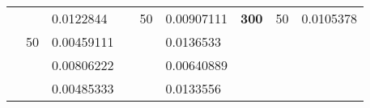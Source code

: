 \begin{table}[H]
\begin{tabular}{|cclcclccc}
\rowcolor[HTML]{DDFDFF} 
\multicolumn{1}{|c|}{\cellcolor[HTML]{FFFFC7}}                                & \multicolumn{1}{c|}{\cellcolor[HTML]{DDFDFF}}                      & \multicolumn{1}{l|}{\cellcolor[HTML]{DAE8FC}0.0122844}   & \multicolumn{1}{c|}{\cellcolor[HTML]{FFFFC7}}                                & \multicolumn{1}{c|}{\multirow{-10}{*}{\cellcolor[HTML]{DDFDFF}50}}  & \multicolumn{1}{l|}{\cellcolor[HTML]{DDFDFF}0.00907111}  & \multicolumn{1}{c|}{\multirow{-19}{*}{\cellcolor[HTML]{FFFFC7}\textbf{300}}} & \multicolumn{1}{c|}{\multirow{-10}{*}{\cellcolor[HTML]{DDFDFF}50}} & \multicolumn{1}{l|}{\cellcolor[HTML]{DDFDFF}0.0105378}   \\ \cline{3-3} \cline{5-9} 
\multicolumn{1}{|c|}{\cellcolor[HTML]{FFFFC7}}                                & \multicolumn{1}{c|}{\multirow{-10}{*}{\cellcolor[HTML]{DDFDFF}50}} & \multicolumn{1}{l|}{\cellcolor[HTML]{DDFDFF}0.00459111}  & \multicolumn{1}{c|}{\cellcolor[HTML]{FFFFC7}}                                & \multicolumn{1}{c|}{\cellcolor[HTML]{DAE8FC}}                       & \multicolumn{1}{l|}{\cellcolor[HTML]{DAE8FC}0.0136533}   &                                                                              &                                                                    &                                                          \\ \cline{2-3} \cline{6-6}
\multicolumn{1}{|c|}{\cellcolor[HTML]{FFFFC7}}                                & \multicolumn{1}{c|}{\cellcolor[HTML]{DAE8FC}}                      & \multicolumn{1}{l|}{\cellcolor[HTML]{DAE8FC}0.00806222}  & \multicolumn{1}{c|}{\cellcolor[HTML]{FFFFC7}}                                & \multicolumn{1}{c|}{\cellcolor[HTML]{DAE8FC}}                       & \multicolumn{1}{l|}{\cellcolor[HTML]{DDFDFF}0.00640889}  &                                                                              &                                                                    &                                                          \\ \cline{3-3} \cline{6-6}
\multicolumn{1}{|c|}{\cellcolor[HTML]{FFFFC7}}                                & \multicolumn{1}{c|}{\cellcolor[HTML]{DAE8FC}}                      & \multicolumn{1}{l|}{\cellcolor[HTML]{DDFDFF}0.00485333}  & \multicolumn{1}{c|}{\cellcolor[HTML]{FFFFC7}}                                & \multicolumn{1}{c|}{\cellcolor[HTML]{DAE8FC}}                       & \multicolumn{1}{l|}{\cellcolor[HTML]{DAE8FC}0.0133556}   &                                                                              &                                                                    &                                                          \\ \cline{3-3} \cline{6-6}

\end{tabular}
\end{table}
